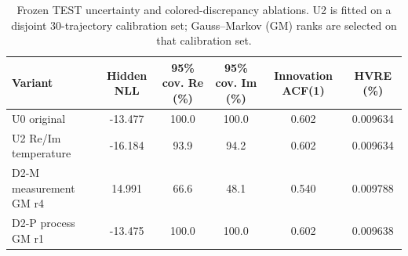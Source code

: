 \begin{table}[t]
\caption{Frozen TEST uncertainty and colored-discrepancy ablations. U2 is fitted on a disjoint 30-trajectory calibration set; Gauss--Markov (GM) ranks are selected on that calibration set.}
\label{tab:uncertainty-results}
\centering
\footnotesize
\begin{tabular}{lccccc}
\toprule
Variant & Hidden NLL & 95\% cov. Re (\%) & 95\% cov. Im (\%) & Innovation ACF(1) & HVRE (\%) \\
\midrule
U0 original & -13.477 & 100.0 & 100.0 & 0.602 & 0.009634 \\
U2 Re/Im temperature & -16.184 & 93.9 & 94.2 & 0.602 & 0.009634 \\
D2-M measurement GM r4 & 14.991 & 66.6 & 48.1 & 0.540 & 0.009788 \\
D2-P process GM r1 & -13.475 & 100.0 & 100.0 & 0.602 & 0.009638 \\
\bottomrule
\end{tabular}
\end{table}
